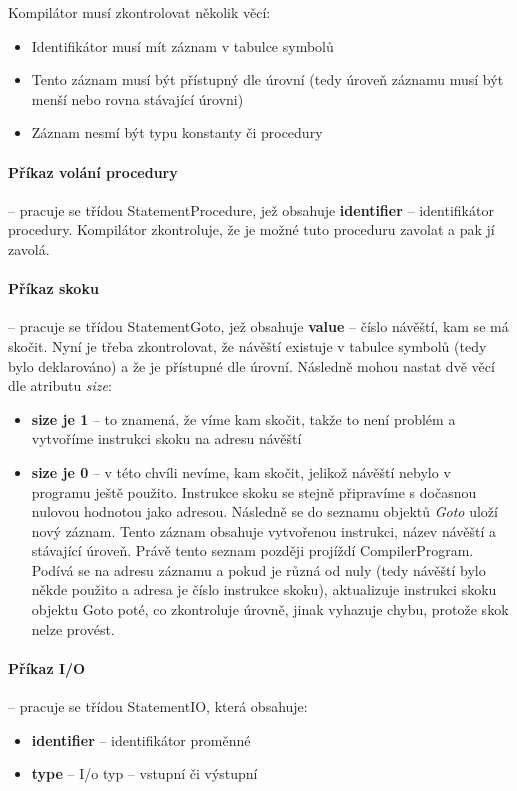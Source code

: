 \documentclass[
12pt,
a4paper,
pdftex,
czech,
titlepage
]{report}
\begin{document}
Kompilátor musí zkontrolovat několik věcí:
\begin{itemize}
\item Identifikátor musí mít záznam v tabulce symbolů
\item Tento záznam musí být přístupný dle úrovní (tedy úroveň záznamu musí být menší nebo rovna stávající úrovni)
\item Záznam nesmí být typu konstanty či procedury
\end{itemize}

\paragraph{Příkaz volání procedury} -- pracuje se třídou StatementProcedure, jež obsahuje \textbf{identifier} -- identifikátor procedury. Kompilátor zkontroluje, že je možné tuto proceduru zavolat a pak jí zavolá.

\paragraph{Příkaz skoku} -- pracuje se třídou StatementGoto, jež obsahuje \textbf{value} -- číslo návěští, kam se má skočit. Nyní je třeba zkontrolovat, že návěští existuje v tabulce symbolů (tedy bylo deklarováno) a že je přístupné dle úrovní. Následně mohou nastat dvě věcí dle atributu \textit{size}:
\begin{itemize}
\item \textbf{size je 1} -- to znamená, že víme kam skočit, takže to není problém a vytvoříme instrukci skoku na adresu návěští
\item \textbf{size je 0} -- v této chvíli nevíme, kam skočit, jelikož návěští nebylo v programu ještě použito. Instrukce skoku se stejně připravíme s dočasnou nulovou hodnotou jako adresou. Následně se do seznamu objektů \textit{Goto} uloží nový záznam. Tento záznam obsahuje vytvořenou instrukci, název návěští a stávající úroveň. Právě tento seznam později projíždí CompilerProgram. Podívá se na adresu záznamu a pokud je různá od nuly (tedy návěští bylo někde použito a adresa je číslo instrukce skoku), aktualizuje instrukci skoku objektu Goto poté, co zkontroluje úrovně, jinak vyhazuje chybu, protože skok nelze provést.
\end{itemize}

\paragraph{Příkaz I/O} -- pracuje se třídou StatementIO, která obsahuje:
\begin{itemize}
\item \textbf{identifier} -- identifikátor proměnné
\item \textbf{type} -- I/o typ -- vstupní či výstupní
\end{itemize}
\end{document}
